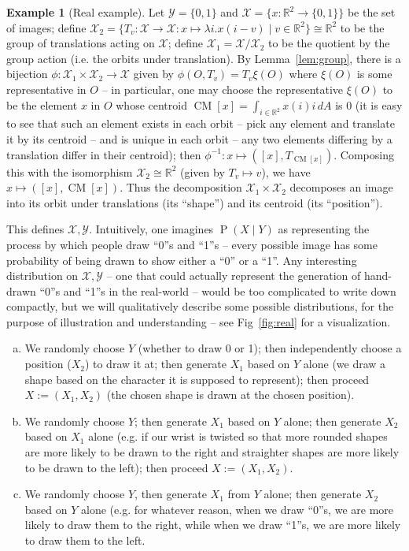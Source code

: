 \documentclass[12pt]{article}
\newcommand{\R}{\mathbb{R}}
\newcommand{\Prob}[1]{\operatorname{P}\left(#1\right)}
\newcommand{\CM}[1]{\operatorname{CM}\left[#1\right]}
\theoremstyle{definition}
\newtheorem{exl}[thm]{Example}
\numberwithin{equation}{section}
\numberwithin{figure}{section}
\numberwithin{table}{section}
\begin{document}
\begin{exl}[Real example]
    \label{exl:real}
    Let $\mathcal{Y}=\{0, 1\}$ and $\mathcal{X}=\{x:\R^2\to\{0,1\}\}$ be the set of images; define $\mathcal{X}_2=\{T_v:\mathcal{X}\to\mathcal{X}:x\mapsto\lambda i. x(i-v)\mid v\in\R^2\} \cong \R^2$ to be the group of translations acting on $\mathcal{X}$; define $\mathcal{X}_1=\mathcal{X}/\mathcal{X}_2$ to be the quotient by the group action (i.e. the orbits under translation). By Lemma~\ref{lem:group}, there is a bijection $\phi:\mathcal{X}_1\times \mathcal{X}_2\to \mathcal{X}$ given by $\phi(O, T_v)=T_v\xi(O)$ where $\xi(O)$ is some representative in $O$ -- in particular, one may choose the representative $\xi(O)$ to be the element $x$ in $O$ whose centroid $\CM{x} = \int_{i\in\R^2}{x(i)i\,dA}$ is 0 (it is easy to see that such an element exists in each orbit -- pick any element and translate it by its centroid -- and is unique in each orbit -- any two elements differing by a translation differ in their centroid); then $\phi^{-1}:x\mapsto ([x], T_{\CM{x}})$. Composing this with the isomorphism $\mathcal{X}_2\cong\R^2$ (given by $T_v\mapsto v$), we have $x\mapsto([x],\CM{x})$. Thus the decomposition $\mathcal{X}_1\times\mathcal{X}_2$ decomposes an image into its orbit under translations (its ``shape'') and its centroid (its ``position'').
    
    This defines $\mathcal{X},\mathcal{Y}$. Intuitively, one imagines $\Prob{X\mid Y}$ as representing the process by which people draw ``0''s and ``1''s -- every possible image has some probability of being drawn to show either a ``0'' or a ``1''. Any interesting distribution on $\mathcal{X},\mathcal{Y}$ -- one that could actually represent the generation of hand-drawn ``0''s and ``1''s in the real-world -- would be too complicated to write down compactly, but we will qualitatively describe some possible distributions, for the purpose of illustration and understanding -- see Fig~\ref{fig:real} for a visualization.
    
    \begin{enumerate}[(a)]
        \item We randomly choose $Y$ (whether to draw 0 or 1); then independently choose a position ($X_2$) to draw it at; then generate $X_1$ based on $Y$ alone (we draw a shape based on the character it is supposed to represent); then proceed $X:=(X_1, X_2)$ (the chosen shape is drawn at the chosen position). 
        \item We randomly choose $Y$; then generate $X_1$ based on $Y$ alone; then generate $X_2$ based on $X_1$ alone (e.g. if our wrist is twisted so that more rounded shapes are more likely to be drawn to the right and straighter shapes are more likely to be drawn to the left); then proceed $X:=(X_1, X_2)$.
        \item We randomly choose $Y$, then generate $X_1$ from $Y$ alone; then generate $X_2$ based on $Y$ alone (e.g. for whatever reason, when we draw ``0''s, we are more likely to draw them to the right, while when we draw ``1''s, we are more likely to draw them  to the left.
    \end{enumerate}
    

\end{exl}
\end{document}
